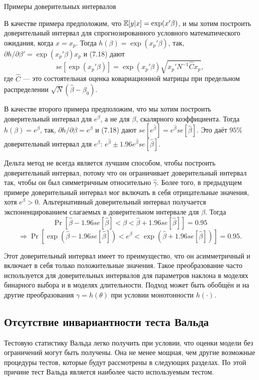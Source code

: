 \begin{center}
Примеры доверительных интервалов
\end{center}

В качестве примера предположим, что $\mathbb{E}[y|x] = \exp(x'\beta)$, и мы хотим построить доверительный интервал для спрогнозированного условного математического ожидания, когда $x = x_p$. Тогда $h(\beta) = \exp(x_p'\beta)$, так, $\partial{h}/\partial{\beta}' = \exp(x_p'\beta)x_p$ и (7.18) дают
\[
se[\exp(x_p'\beta)] = \exp(x_p'\beta)\sqrt{x_p'N^{-1}\hat{C}x_p},
\]
где $\hat{C}$ --- это состоятельная оценка ковариационной матрицы при предельном распределении $\sqrt{N}(\hat{\beta} - \beta_0)$.

В качестве второго примера предположим, что мы хотим построить доверительный интервал для $e^{\beta}$, а не для $\beta$, скалярного коэффициента. Тогда $h(\beta) = e^{\beta}$, так, $\partial{h}/\partial{\beta} = e^{\beta}$ и (7.18) дают $se[e^{\hat{\beta}}] = e^{\hat{\beta}}se[\hat{\beta}]$. Это даёт $95\%$ доверительный интервал для $e^{\beta}$: $e^{\hat{\beta}} \pm 1.96e^{\hat{\beta}}se[\hat{\beta}]$.

Дельта метод не всегда является лучшим способом, чтобы построить доверительный интервал, потому что он ограничивает доверительный интервал так, чтобы он был симметричным относительно $\hat{\gamma}$. Более того, в предыдущем примере доверительный интервал мог включать в себя отрицательные значения, хотя $e^{\beta} > 0$. Альтернативный доверительный интервал получается экспоненцированием слагаемых в доверительном интервале для $\beta$. Тогда
\[
\Pr[\hat{\beta} - 1.96se[\hat{\beta}] < \beta < \hat{\beta} + 1.96se[\hat{\beta}]] = 0.95
\]
\[
\Rightarrow \Pr[\exp(\hat{\beta} - 1.96se[\hat{\beta}]) < e^{\beta} < \exp(\hat{\beta} + 1.96se[\hat{\beta}])] = 0.95.
\]

Этот доверительный интервал имеет то преимущество, что он асимметричный и включает в себя только положительные значения. Такое преобразование часто используется для доверительных интервалов для параметров наклона в моделях бинарного выбора и в моделях длительности. Подход может быть обобщён и на другие преобразования $\gamma = h(\theta)$ при условии монотонности $h(\cdot)$.

\subsection{Отсутствие инвариантности теста Вальда}

Тестовую статистику Вальда легко получить при условии, что оценки модели без ограничений могут быть получены. Она не менее мощная, чем другие возможные процедуры тестов, которые будут рассмотрены в следующих разделах. По этой причине тест Вальда является наиболее часто используемым тестом.

